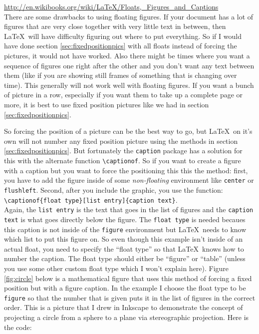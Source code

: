 \documentclass{article}
\newcommand{\nid}{\noindent} %
\begin{document}
\nid\url{http://en.wikibooks.org/wiki/LaTeX/Floats,_Figures_and_Captions}\\

There are some drawbacks to using floating figures.  If your document has a lot of figures that are very close together with very little text in between, then \LaTeX\ will have difficulty figuring out where to put everything.  So if I would have done section \ref{sec:fixedpositionpics} with all floats instead of forcing the pictures, it would not have worked.  Also there might be times where you want a sequence of figures one right after the other and you don't want any text between them (like if you are showing still frames of something that is changing over time).  This generally will not work well with floating figures. If you want a bunch of picture in a row, especially if you want them to take up a complete page or more, it is best to use fixed position pictures like we had in section \ref{sec:fixedpositionpics}.

So forcing the position of a picture can be the best way to go, but \LaTeX\ on it's own will not number any fixed position picture using the methods in section \ref{sec:fixedpositionpics}.  But fortunately the \texttt{caption} package has a solution for this with the alternate function \verb|\captionof|. So if you want to create a figure with a caption but you want to force the positioning this this the method: first, you have to add the figure inside of some \emph{non-floating} environment like \verb|center| or \verb|flushleft|.  Second, after you include the graphic, you use the function:\\
\verb|\captionof{float type}[list entry]{caption text}|.\\
Again, the \verb|list entry| is the text that goes in the list of figures and the \verb|caption text| is what goes directly below the figure.  The \verb|float type| is needed becaues this caption is not inside of the \texttt{figure} environment but \LaTeX\ needs to know which list to put this figure on.  So even though this example isn't inside of an actual float, you need to specify the ``float type'' so that \LaTeX\ knows how to number the caption.  The float type should either be ``figure'' or ``table'' (unless you use some other custom float type which I won't explain here).  Figure \ref{fig:circle} below is a mathematical figure that uses this method of forcing a fixed position but with a figure caption.  In the example I choose the float type to be \verb|figure| so that the number that is given puts it in the list of figures in the correct order.  This is a picture that I drew in Inkscape to demonstrate the concept of projecting a circle from a sphere to a plane via stereographic projection.  Here is the code:\\
\end{document}
